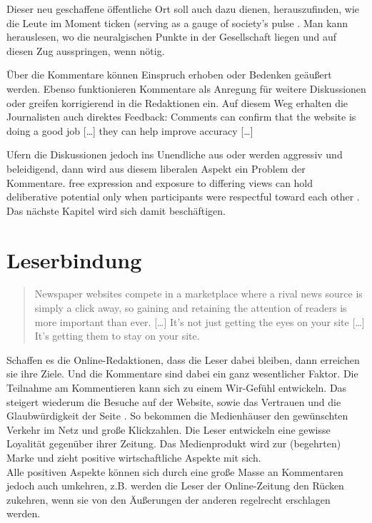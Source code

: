 Dieser neu geschaffene öffentliche Ort soll auch dazu dienen, herauszufinden,
wie die Leute im Moment \glqq ticken\grqq\- (\glqq serving as a gauge of society’s pulse\grqq\-
 \autocite[S.~181]{loke}. Man kann herauslesen, wo die neuralgischen Punkte in
der Gesellschaft liegen und auf diesen Zug ausspringen, wenn nötig.

Über die Kommentare können Einspruch erhoben oder Bedenken geäußert werden.
Ebenso funktionieren Kommentare als Anregung für weitere Diskussionen oder
greifen korrigierend  in die Redaktionen ein. Auf diesem Weg erhalten die
Journalisten auch direktes Feedback: \glqq Comments can confirm that the website is
doing a good job [\ldots] they can help improve accuracy [\ldots]\grqq\-
\autocite[S.~105]{reich}

Ufern die Diskussionen jedoch ins Unendliche aus oder werden aggressiv und
beleidigend, dann wird aus diesem liberalen Aspekt ein Problem der Kommentare.
\glqq[\ldots] free expression and exposure to differing views can hold deliberative
potential only when participants were respectful toward each other\grqq\-
\autocite[S.~7]{santana:2011}. Das nächste Kapitel wird sich damit beschäftigen.





\section{Leserbindung}
\begin{quote}
\glqq Newspaper websites compete in a marketplace where a rival news source is simply
a click away, so gaining and retaining the attention of readers is more
important than ever. [\ldots] It’s not just getting the eyes on your site
[\ldots] It’s getting them to stay on your site.\grqq\- \autocite[S.~144]{singer}
\end{quote}

Schaffen es die Online-Redaktionen, dass die Leser dabei bleiben, dann erreichen
sie ihre Ziele. Und die Kommentare sind dabei ein ganz wesentlicher Faktor. Die
Teilnahme am Kommentieren kann sich zu einem Wir-Gefühl entwickeln. Das steigert
wiederum die Besuche auf der Website, sowie das Vertrauen und die
Glaubwürdigkeit der Seite \autocite[S.~215]{meyer-carey}. So bekommen die
Medienhäuser den gewünschten Verkehr im Netz und große Klickzahlen. Die Leser
entwickeln eine gewisse Loyalität gegenüber ihrer Zeitung. Das Medienprodukt
wird zur (begehrten) Marke und zieht positive wirtschaftliche Aspekte mit sich.\\
Alle positiven Aspekte können sich durch eine große Masse an Kommentaren jedoch
auch umkehren, z.B. werden die Leser der Online-Zeitung den Rücken zukehren,
wenn sie von den Äußerungen der anderen regelrecht erschlagen werden.

